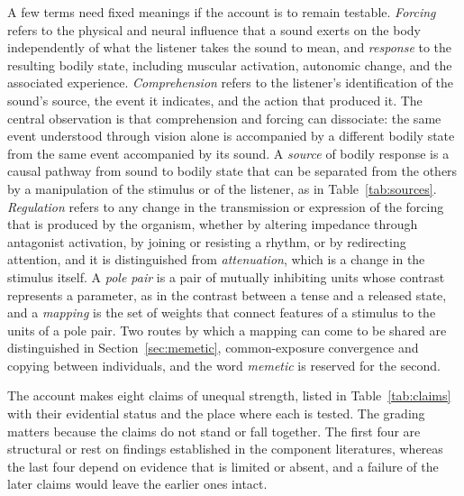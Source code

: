\documentclass[11pt]{article}
\theoremstyle{plain}
\theoremstyle{definition}
\begin{document}
A few terms need fixed meanings if the account is to remain testable. \textit{Forcing} refers to the physical and neural influence that a sound exerts on the body independently of what the listener takes the sound to mean, and \textit{response} to the resulting bodily state, including muscular activation, autonomic change, and the associated experience. \textit{Comprehension} refers to the listener's identification of the sound's source, the event it indicates, and the action that produced it. The central observation is that comprehension and forcing can dissociate: the same event understood through vision alone is accompanied by a different bodily state from the same event accompanied by its sound. A \textit{source} of bodily response is a causal pathway from sound to bodily state that can be separated from the others by a manipulation of the stimulus or of the listener, as in Table~\ref{tab:sources}. \textit{Regulation} refers to any change in the transmission or expression of the forcing that is produced by the organism, whether by altering impedance through antagonist activation, by joining or resisting a rhythm, or by redirecting attention, and it is distinguished from \textit{attenuation}, which is a change in the stimulus itself. A \textit{pole pair} is a pair of mutually inhibiting units whose contrast represents a parameter, as in the contrast between a tense and a released state, and a \textit{mapping} is the set of weights that connect features of a stimulus to the units of a pole pair. Two routes by which a mapping can come to be shared are distinguished in Section~\ref{sec:memetic}, common-exposure convergence and copying between individuals, and the word \textit{memetic} is reserved for the second.

The account makes eight claims of unequal strength, listed in Table~\ref{tab:claims} with their evidential status and the place where each is tested. The grading matters because the claims do not stand or fall together. The first four are structural or rest on findings established in the component literatures, whereas the last four depend on evidence that is limited or absent, and a failure of the later claims would leave the earlier ones intact.
\end{document}

